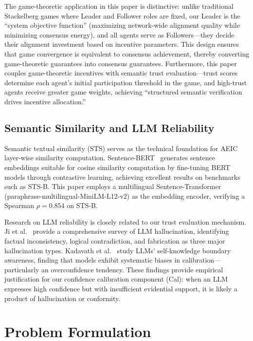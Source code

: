 \documentclass[12pt,a4paper]{article}
\begin{document}
The game-theoretic application in this paper is distinctive: unlike traditional Stackelberg games where Leader and Follower roles are fixed, our Leader is the ``system objective function'' (maximizing network-wide alignment quality while minimizing consensus energy), and all agents serve as Followers---they decide their alignment investment based on incentive parameters. This design ensures that game convergence is equivalent to consensus achievement, thereby converting game-theoretic guarantees into consensus guarantees. Furthermore, this paper couples game-theoretic incentives with semantic trust evaluation---trust scores determine each agent's initial participation threshold in the game, and high-trust agents receive greater game weights, achieving ``structured semantic verification drives incentive allocation.''

\subsection{Semantic Similarity and LLM Reliability}

Semantic textual similarity (STS) serves as the technical foundation for AEIC layer-wise similarity computation. Sentence-BERT~\cite{reimers2019sentence} generates sentence embeddings suitable for cosine similarity computation by fine-tuning BERT models through contrastive learning, achieving excellent results on benchmarks such as STS-B. This paper employs a multilingual Sentence-Transformer (paraphrase-multilingual-MiniLM-L12-v2) as the embedding encoder, verifying a Spearman $\rho = 0.854$ on STS-B.

Research on LLM reliability is closely related to our trust evaluation mechanism. Ji et al.~\cite{ji2023hallucination} provide a comprehensive survey of LLM hallucination, identifying factual inconsistency, logical contradiction, and fabrication as three major hallucination types. Kadavath et al.~\cite{kadavath2022language} study LLMs' self-knowledge boundary awareness, finding that models exhibit systematic biases in calibration---particularly an overconfidence tendency. These findings provide empirical justification for our confidence calibration component (Cal): when an LLM expresses high confidence but with insufficient evidential support, it is likely a product of hallucination or conformity.

\section{Problem Formulation}\label{sec:formulation}
\end{document}
